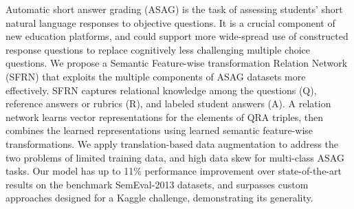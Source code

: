 Automatic short answer grading (ASAG) is the task of assessing students' short natural language responses to objective questions. It is a crucial component of new education platforms, and could support more wide-spread use of constructed response questions to replace cognitively less challenging multiple choice questions. We propose a Semantic Feature-wise transformation Relation Network (SFRN) that exploits the multiple components of ASAG datasets more effectively. SFRN captures relational knowledge among the questions (Q), reference answers or rubrics (R), and labeled student answers (A). A relation network learns vector representations for the elements of QRA triples, then combines the learned representations using learned semantic feature-wise transformations. We apply translation-based data augmentation to address the two problems of limited training data, and high data skew for multi-class ASAG tasks. Our model has up to 11\% performance improvement over state-of-the-art results on the benchmark SemEval-2013 datasets, and surpasses custom approaches designed for a Kaggle challenge, demonstrating its generality.
